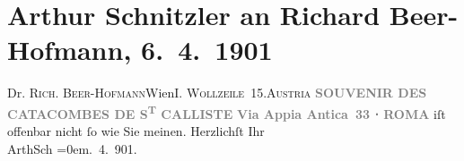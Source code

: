 

         
         \renewcommand{\erwaehntePersonen}{Personen: Richard Beer-Hofmann}
         \renewcommand{\erwaehnteOrte}{Orte: Calixtus-Katakombe, I., Innere Stadt, Rom, Via Appia, Wien, Wollzeile, Österreich}
         \renewcommand{\erwaehnteWerke}{}
               \section[Arthur Schnitzler an Richard Beer-Hofmann, 6. 4. 1901]{ Arthur Schnitzler an Richard Beer-Hofmann, 6. 4. 1901}\nopagebreak{}\rehead{ }\begin{ledgroupsized}[t]{13cm}\normalsize\beginnumbering \toendnotes[C]{\smallbreak\pagebreak[2]} 
\toendnotes[C]{\smallbreak}\pstart{}{\pb}Dr. \textsc{Rich. Beer-Hofmann}\pend{}\pstart{}Wien\pend{}\pstart{}\textsc{I. Wollzeile 15}.\pend{}\pstart{}\textsc{Austria}\pend{}{\bigskip}\pstart
           \noindent{}\centering{}{\pb}\textcolor{gray}{\textbf{SOUVENIR DES CATACOMBES DE
                              S\textsuperscript{T} CALLISTE}}\pend
           \pstart
           \noindent{}\centering{}\textcolor{gray}{\textbf{Via Appia Antica 33 ⋅ ROMA}}\pend
           \pstart
           \label{T_L01106-1v}\label{T_L01106-1h} iſt offenbar nicht ſo wie Sie meinen.\pend
           \pstart
           Herzlichſt Ihr{\\[\baselineskip]}\spacefill\mbox{ArthSch}\pend
           \leftskip=0em{}. 4. 901.\pend
           
         
         \endnumbering{}\end{ledgroupsized}  \newcommand{\dateiname}{L01106}\newcommand{\titel}{Arthur Schnitzler an Richard Beer-Hofmann, 6. 4. 1901}\newcommand{\editorInnen}{Martin Anton Müller und Gerd-Hermann Susen}
      